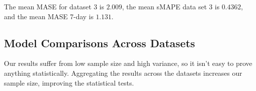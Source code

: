 The mean MASE for dataset 3 is $2.009$,
the mean sMAPE data set 3 is $0.4362$,
and the mean MASE 7-day is $1.131$.






\subsection{Model Comparisons Across Datasets}
Our results suffer from low sample size and high variance, so it isn't easy
to prove anything statistically. Aggregating the results across the datasets
increases our sample size, improving the statistical tests.

